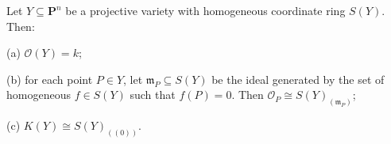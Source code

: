 Let $Y \subseteq \mathbf{P}^n$ be a projective variety with homogeneous coordinate ring $S(Y)$. Then:

(a) $\mathcal{O}(Y) = k$;

(b) for each point $P \in Y$, let $\mathfrak{m}_P \subseteq S(Y)$ be the ideal generated by the set of homogeneous $f \in S(Y)$ such that $f(P) = 0$. Then $\mathcal{O}_P \cong S(Y)_{(\mathfrak{m}_P)}$;

(c) $K(Y) \cong S(Y)_{((0))}$.
